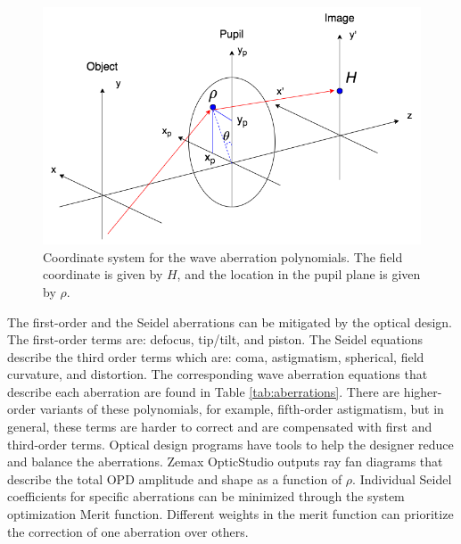 \begin{figure}
    \centering
    \includegraphics[width=.8\textwidth]{Chapter Materials/Chapter Three Materials/Seidelcoord.png}
    \caption{Coordinate system for the wave aberration polynomials. The field coordinate is given by $H$, and the location in the pupil plane is given by $\rho$.}
    \label{fig:Seidel}
    \end{figure}
    
The first-order and the Seidel aberrations can be mitigated by the optical design. The first-order terms are: defocus, tip/tilt, and piston. The Seidel equations describe the third order terms which are: coma, astigmatism, spherical, field curvature, and distortion. The corresponding wave aberration equations that describe each aberration are found in Table \ref{tab:aberrations}. There are higher-order variants of these polynomials, for example, fifth-order astigmatism, but in general, these terms are harder to correct and are compensated with first and third-order terms. Optical design programs have tools to help the designer reduce and balance the aberrations. Zemax OpticStudio outputs ray fan diagrams that describe the total OPD amplitude and shape as a function of $\rho$. Individual Seidel coefficients for specific aberrations can be minimized through the system optimization Merit function. Different weights in the merit function can prioritize the correction of one aberration over others. 


